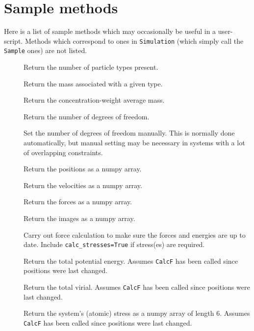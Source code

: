 \documentclass[a4paper]{article}
\begin{document}
\section{\label{Sample_methods}Sample methods}

Here is a list of sample methods which may occasionally be useful in a user-script. Methods which correspond to ones in \verb|Simulation| (which simply call the \verb|Sample| ones) are not listed.

\begin{description}
\item[]
  Return the number of particle types present.
\item[]
  Return the mass associated with a given type.
\item[]
  Return the concentration-weight average mass.
\item[]
  Return the number of degrees of freedom.
\item[]
  Set the number of degrees of freedom manually. This is normally done automatically, but manual setting may be necessary in systems with a lot of overlapping constraints.
\item[]
  Return the positions as a numpy array.
\item[]
  Return the velocities as a numpy array.
\item[]
  Return the forces as a numpy array.
\item[]
  Return the images as a numpy array.
\item[]
  Carry out force calculation to make sure the forces and energies are up to date. Include \verb|calc_stresses=True| if stress(es) are required.
\item[]
  Return the total potential energy. Assumes \verb|CalcF| has been called since positions were last changed.
\item[]
  Return the total virial. Assumes \verb|CalcF| has been called since positions were last changed.
\item[]
  Return the system's (atomic) stress as a numpy array of length 6. Assumes \verb|CalcF| has been called since positions were last changed.
\item[]

\end{description}
\end{document}

